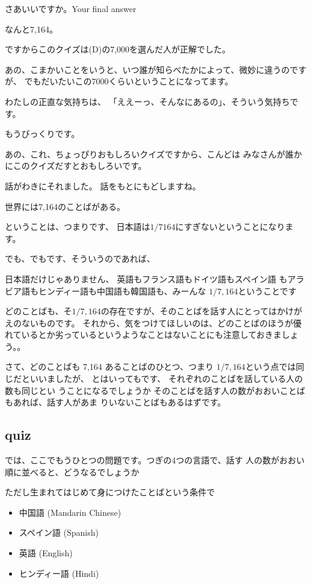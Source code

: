 \documentclass[12pt]{jlreq}
\begin{document}
さあいいですか。Your final answer

なんと7,164。

ですからこのクイズは(D)の7,000を選んだ人が正解でした。

あの、こまかいことをいうと、いつ誰が知らべたかによって、微妙に違うのですが、
でもだいたいこの7000くらいということになってます。



わたしの正直な気持ちは、
「ええーっ、そんなにあるの」、そういう気持ちです。

もうびっくりです。

あの、これ、ちょっぴりおもしろいクイズですから、こんどは
みなさんが誰かにこのクイズだすとおもしろいです。

話がわきにそれました。
話をもとにもどしますね。



世界には7,164のことばがある。

ということは、つまりです、
日本語は${1}/{7164}$にすぎないということになります。

でも、でもです、そういうのであれば、

日本語だけじゃありません、
英語もフランス語もドイツ語もスペイン語
もアラビア語もヒンディー語も中国語も韓国語も、みーんな
$1/7,164$ということです

どのことばも、そ$1/7,164$の存在ですが、そのことばを話す人にとってはかけがえのないものです。
それから、気をつけてほしいのは、どのことばのほうが優れているとか劣っているというようなことはないことにも注意しておきましょう。。

\hrulefill

さて、どのことばも 7,164 あることばのひとつ、つまり
${1}/{7,164}$という点では同じだといいましたが、
とはいってもです、
それぞれのことばを話している人の数も同じとい
うことになるでしょうか
そのことばを話す人の数がおおいことばもあれば、話す人があま
りいないことばもあるはずです。

\subsection{quiz}

では、ここでもうひとつの問題です。つぎの4つの言語で、話す
人の数がおおい順に並べると、どうなるでしょうか

ただし生まれてはじめて身につけたことばという条件で

\begin{itemize}
 \item  中国語 (Mandarin Chinese)
 \item  スペイン語 (Spanish)
 \item  英語 (English)
 \item  ヒンディー語 (Hindi)
\end{itemize}
\end{document}
